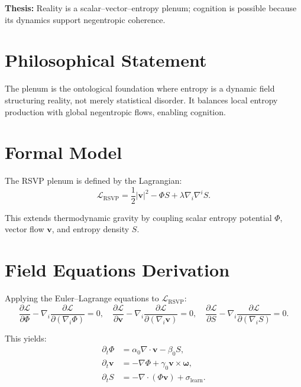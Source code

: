 \documentclass[12pt]{book}
\theoremstyle{definition}
\begin{document}
\textbf{Thesis:} Reality is a scalar–vector–entropy plenum; cognition is possible because its dynamics support negentropic coherence.

\section{Philosophical Statement}
The plenum is the ontological foundation where entropy is a dynamic field structuring reality, not merely statistical disorder. It balances local entropy production with global negentropic flows, enabling cognition.

\section{Formal Model}
The RSVP plenum is defined by the Lagrangian:
\begin{equation}
\label{eq:rsvp_lagrangian}
\mathcal{L}_{\text{RSVP}} = \frac{1}{2}|\mathbf{v}|^2 - \Phi S + \lambda \nabla_i \nabla^i S.
\end{equation}

This extends thermodynamic gravity \cite{jacobson1995thermodynamics, gibbs2025entropic} by coupling scalar entropy potential \(\Phi\), vector flow \(\mathbf{v}\), and entropy density \(S\).

\section{Field Equations Derivation}
Applying the Euler–Lagrange equations to \(\mathcal{L}_{\text{RSVP}}\):
\begin{equation}
\frac{\partial \mathcal{L}}{\partial \Phi} - \nabla_i \frac{\partial \mathcal{L}}{\partial (\nabla_i \Phi)} = 0, \quad
\frac{\partial \mathcal{L}}{\partial \mathbf{v}} - \nabla_i \frac{\partial \mathcal{L}}{\partial (\nabla_i \mathbf{v})} = 0, \quad
\frac{\partial \mathcal{L}}{\partial S} - \nabla_i \frac{\partial \mathcal{L}}{\partial (\nabla_i S)} = 0.
\end{equation}

This yields:
\begin{align}
\partial_t \Phi &= \alpha_0 \nabla \cdot \mathbf{v} - \beta_0 S, \label{eq:phi_eq} \\
\partial_t \mathbf{v} &= -\nabla \Phi + \gamma_0 \mathbf{v} \times \boldsymbol{\omega}, \label{eq:v_eq} \\
\partial_t S &= -\nabla \cdot (\Phi \mathbf{v}) + \sigma_{\text{learn}}. \label{eq:s_eq}
\end{align}
\end{document}
